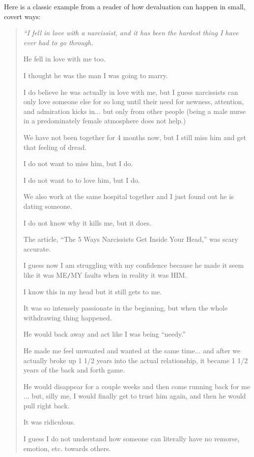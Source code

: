 \documentclass[oneside]{book}
\numberwithin{equation}{section}
\begin{document}
Here is a classic example from a reader of how devaluation can happen in small, covert ways:
\begin{quotation}\it
    ``I fell in love with a narcissist, and it has been the hardest thing I have ever had to go through.
    
    He fell in love with me too.
    
    I thought he was the man I was going to marry.
    
    I do believe he was actually in love with me, but I guess narcissists can only love someone else for so long until their need for newness, attention, and admiration kicks in$\ldots$ but only from other people (being a male nurse in a predominately female atmosphere does not help.)
    
    We have not been together for 4 months now, but I still miss him and get that feeling of dread.
    
    I do not want to miss him, but I do.
    
    I do not want to to love him, but I do.
    
    We also work at the same hospital together and I just found out he is dating someone.
    
    I do not know why it kills me, but it does.
    
    The article, ``The 5 Ways Narcissists Get Inside Your Head,'' was scary accurate.
    
    I guess now I am struggling with my confidence because he made it seem like it was ME\texttt{/}MY faults when in reality it was HIM.
    
    I know this in my head but it still gets to me.
    
    It was so intensely passionate in the beginning, but when the whole withdrawing thing happened.
    
    He would back away and act like I was being ``needy.''
    
    He made me feel unwanted and wanted at the same time$\ldots$ and after we actually broke up 1 1/2 years into the actual relationship, it became 1 1/2 years of the back and forth game.
    
    He would disappear for a couple weeks and then come running back for me$\ldots$ but, silly me, I would finally get to trust him again, and then he would pull right back.
    
    It was ridiculous.
    
    I guess I do not understand how someone can literally have no remorse, emotion, etc. towards others.
    

\end{quotation}
\end{document}
